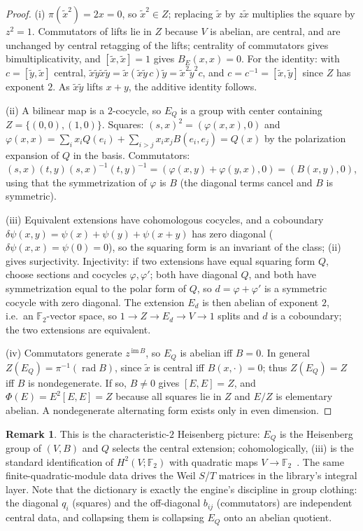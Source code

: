 \documentclass[11pt]{article}
\theoremstyle{plain}
\theoremstyle{definition}
\newtheorem{remark}{Remark}
\newcommand{\F}{\mathbb{F}}
\newcommand{\rad}{\operatorname{rad}}
\begin{document}
\begin{proof}
(i) $\pi(\tilde x^2)=2x=0$, so $\tilde x^2\in Z$; replacing $\tilde x$ by
$z\tilde x$ multiplies the square by $z^2=1$. Commutators of lifts lie in
$Z$ because $V$ is abelian, are central, and are unchanged by central
retagging of the lifts; centrality of commutators gives bimultiplicativity,
and $[\tilde x,\tilde x]=1$ gives $B_E(x,x)=0$. For the identity: with
$c=[\tilde y,\tilde x]$ central,
$\tilde x\tilde y\tilde x\tilde y
=\tilde x(\tilde x\tilde y\,c)\tilde y=\tilde x^2\tilde y^2c$,
and $c=c^{-1}=[\tilde x,\tilde y]$ since $Z$ has exponent $2$. As
$\tilde x\tilde y$ lifts $x+y$, the additive identity follows.

(ii) A bilinear map is a $2$-cocycle, so $E_Q$ is a group with center
containing $Z=\{(0,0),(1,0)\}$. Squares: $(s,x)^2=(\varphi(x,x),0)$ and
$\varphi(x,x)=\sum_i x_iQ(e_i)+\sum_{i>j}x_ix_jB(e_i,e_j)=Q(x)$ by the
polarization expansion of $Q$ in the basis. Commutators:
$(s,x)(t,y)(s,x)^{-1}(t,y)^{-1}=(\varphi(x,y)+\varphi(y,x),0)
=(B(x,y),0)$, using that the symmetrization of $\varphi$ is $B$ (the
diagonal terms cancel and $B$ is symmetric).

(iii) Equivalent extensions have cohomologous cocycles, and a coboundary
$\delta\psi(x,y)=\psi(x)+\psi(y)+\psi(x+y)$ has zero diagonal
($\delta\psi(x,x)=\psi(0)=0$), so the squaring form is an invariant of the
class; (ii) gives surjectivity. Injectivity: if two extensions have equal
squaring form $Q$, choose sections and cocycles $\varphi,\varphi'$; both
have diagonal $Q$, and both have symmetrization equal to the polar form of
$Q$, so $d=\varphi+\varphi'$ is a symmetric cocycle with zero diagonal. The
extension $E_d$ is then abelian of exponent $2$, i.e.\ an $\F_2$-vector
space, so $1\to Z\to E_d\to V\to 1$ splits and $d$ is a coboundary; the two
extensions are equivalent.

(iv) Commutators generate $z^{\,\mathrm{im}\,B}$, so $E_Q$ is abelian iff
$B=0$. In general $Z(E_Q)=\pi^{-1}(\rad B)$, since $\tilde x$
is central iff $B(x,\cdot)=0$; thus $Z(E_Q)=Z$ iff $B$ is nondegenerate. If
so, $B\neq0$ gives $[E,E]=Z$, and $\Phi(E)=E^2[E,E]=Z$ because all squares
lie in $Z$ and $E/Z$ is elementary abelian. A nondegenerate alternating
form exists only in even dimension.
\end{proof}

\begin{remark}
This is the characteristic-$2$ Heisenberg picture: $E_Q$ is the Heisenberg
group of $(V,B)$ and $Q$ selects the central extension; cohomologically,
(iii) is the standard identification of $H^2(V;\F_2)$ with quadratic maps
$V\to\F_2$~\cite{Quillen71}. The same finite-quadratic-module data drives
the Weil $S$/$T$ matrices in the library's integral layer. Note that the
dictionary is exactly the engine's discipline in group clothing: the
diagonal $q_i$ (squares) and the off-diagonal $b_{ij}$ (commutators) are
independent central data, and collapsing them is collapsing $E_Q$ onto an
abelian quotient.
\end{remark}
\end{document}
